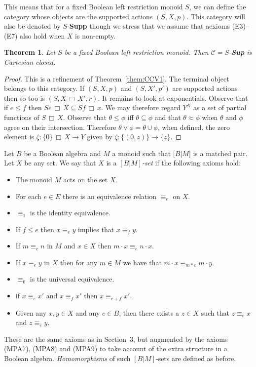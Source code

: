 \documentclass[a4paper]{amsart}
\newtheorem{theorem}{Theorem}[section]
\begin{document}
This means that for a fixed Boolean left restriction monoid $S$,
we can define the category whose objects are the supported actions $(S,X,p)$.
This category will also be denoted by $S$-{\bf Supp} though we stress 
that we assume that acxioms (E3)--(E7) also hold when $X$ is non-empty.


\begin{theorem}\label{them:CCV2} Let $S$ be a fixed Boolean left restriction monoid.
Then $\mathscr{C} = S$-{\bf Sup} is Cartesian closed.
\end{theorem}
\begin{proof} This is a refinement of Theorem~\ref{them:CCV1}.  
The terminal object belongs to this category.
If $(S,X,p)$ and $(S,X',p')$ are supported actions
then so too is $(S,X \,\Box \,X',r)$.
It remains to look at exponentials.
Observe that if $e \leq f$ then $Se \, \Box \, X \subseteq Sf \, \Box \, x$.
We may therefore regard $Y^{X}$ as a set of partial functions of $S \, \Box \, X$.
Observe that $\theta \leq \phi$ iff $\theta \subseteq \phi$
and that $\theta \approx \phi$ when $\theta$ and $\phi$ agree on their intersection.
Therefore $\theta \vee \phi = \theta \cup \phi$, when defined.
the zero element is $\zeta \colon \{ 0\} \, \Box \, X \rightarrow Y$ given by
$\zeta \colon \{(0,z)\} \rightarrow \{ z\}$.
\end{proof}


Let $B$ be a Boolean algebra and $M$ a monoid such that $[B|M$] is a matched pair.
Let $X$ be any set.
We say that $X$ is a {\em $[B|M]$-set} if the following axioms hold:
\begin{itemize}
\item[{\rm (MPA1).}] The monoid $M$ acts on the set $X$.
\item[{\rm (MPA2).}] For each $e \in E$ there is an equivalence relation $\equiv_{e}$ on $X$.
\item[{\rm (MPA3).}] $\equiv_{1}$ is the identity equivalence.
\item[{\rm (MPA4).}] If $f \leq e$ then $x \equiv_{e} y$ implies that $x \equiv_{f} y$.
\item[{\rm (MPA5).}] If $m \equiv_{e} n$ in $M$ and $x \in X$ then $m \cdot x \equiv_{e} n \cdot x$.
\item[{\rm (MPA6).}] If $x \equiv_{e} y$ in $X$ then for any $m \in M$ we have that $m \cdot x \equiv_{m \ast e} m \cdot y$.
\item[{\rm (MPA7).}] $\equiv_{0}$ is the universal equivalence.
\item[{\rm (MPA8).}] if $x \equiv_{e} x'$ and $x \equiv_{f} x'$ then $x \equiv_{e+f} x'$. 
\item[{\rm (MPA9).}] Given any $x,y \in X$ and any $e \in B$, then there exists a $z \in X$ such that $z \equiv_{e} x$ and $z \equiv_{\bar{e}} y$. 
\end{itemize}
These are the same axioms as in Section~3, but augmented by the axioms (MPA7), (MPA8) and (MPA9) to take account of the extra structure in a Boolean algebra.
{\em Homomorphisms} of such $[B|M]$-sets are defined as before.
\end{document}
